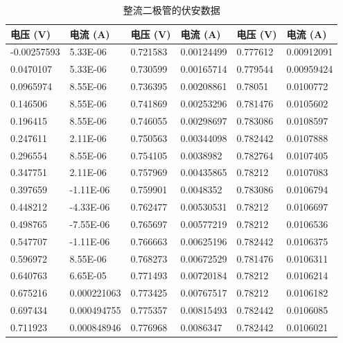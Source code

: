 \documentclass[UTF8]{article}
\theoremstyle{MyLineTheoremStyle} %
\theoremstyle{MyBlockTheoremStyle} %
\theoremstyle{MySubsubsectionStyle} %
\begin{document}
\begin{table}[H]\centering
\caption{整流二极管的伏安数据}
\label{整流二极管伏安数据}
\begin{tabular}{|ll|ll|ll|}
    \hline
    电压 (V)  & 电流 (A)   & 电压 (V)  & 电流 (A)   &电压 (V)  & 电流 (A) \\ \hline
    -0.00257593 & 5.33E-06    & 0.721583 & 0.00124499 & 0.777612 & 0.00912091  \\
    0.0470107   & 5.33E-06    & 0.730599 & 0.00165714 & 0.779544 & 0.00959424  \\
    0.0965974   & 8.55E-06    & 0.736395 & 0.00208861 & 0.78051  & 0.0100772   \\
    0.146506    & 8.55E-06    & 0.741869 & 0.00253296 & 0.781476 & 0.0105602   \\
    0.196415    & 8.55E-06    & 0.746055 & 0.00298697 & 0.783086 & 0.0108597   \\
    0.247611    & 2.11E-06    & 0.750563 & 0.00344098 & 0.782442 & 0.0107888   \\
    0.296554    & 8.55E-06    & 0.754105 & 0.0038982  & 0.782764 & 0.0107405   \\
    0.347751    & 2.11E-06    & 0.757969 & 0.00435865 & 0.78212  & 0.0107083   \\
    0.397659    & -1.11E-06   & 0.759901 & 0.0048352  & 0.783086 & 0.0106794   \\
    0.448212    & -4.33E-06   & 0.762477 & 0.00530531 & 0.78212  & 0.0106697   \\
    0.498765    & -7.55E-06   & 0.765697 & 0.00577219 & 0.78212  & 0.0106536   \\
    0.547707    & -1.11E-06   & 0.766663 & 0.00625196 & 0.782442 & 0.0106375   \\
    0.596972    & 8.55E-06    & 0.768273 & 0.00672529 & 0.781476 & 0.0106311   \\
    0.640763    & 6.65E-05    & 0.771493 & 0.00720184 & 0.78212  & 0.0106214   \\
    0.675216    & 0.000221063 & 0.773425 & 0.00767517 & 0.78212  & 0.0106182   \\
    0.697434    & 0.000494755 & 0.775357 & 0.00815493 & 0.782442 & 0.0106085   \\
    0.711923    & 0.000848946 & 0.776968 & 0.0086347  & 0.782442 & 0.0106021  \\
    \hline
\end{tabular}
\end{table}
\end{document}
